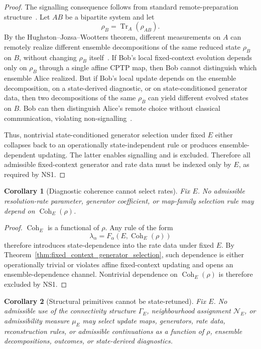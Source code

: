\documentclass[aps,prx,onecolumn,11pt]{revtex4-2}
\theoremstyle{plain}
\newtheorem{corollary}{Corollary}
\theoremstyle{definition}
\theoremstyle{remark}
\newcommand{\Coh}{\operatorname{Coh}}       %
\providecommand{\Tr}{\operatorname{Tr}}
\begin{document}
\begin{proof}
The signalling consequence follows from standard remote-preparation
structure~\cite{HughstonJozsaWootters1993}. Let \(AB\) be a bipartite
system and let
\[
\rho_B=\Tr_A(\rho_{AB}).
\]
By the Hughston--Jozsa--Wootters theorem, different measurements on
\(A\) can remotely realize different ensemble decompositions of the
same reduced state \(\rho_B\) on \(B\), without changing \(\rho_B\)
itself~\cite{NielsenChuang2010,Watrous2018}. If Bob's local
fixed-context evolution depends only on \(\rho_B\) through a single
affine CPTP map, then Bob cannot distinguish which ensemble Alice
realized. But if Bob's local update depends on the ensemble
decomposition, on a state-derived diagnostic, or on state-conditioned
generator data, then two decompositions of the same \(\rho_B\) can yield
different evolved states on \(B\). Bob can then distinguish Alice's
remote choice without classical communication, violating
non-signalling~\cite{Gisin1989,Gisin1990,Polchinski1991,Watrous2018}.

Thus, nontrivial state-conditioned generator selection under fixed
\(E\) either collapses back to an operationally state-independent rule
or produces ensemble-dependent updating. The latter enables signalling
and is excluded. Therefore all admissible fixed-context generator and
rate data must be indexed only by \(E\), as required by NS1.
\end{proof}

\begin{corollary}[Diagnostic coherence cannot select rates]
\label{cor:coherence_cannot_select_rates}
Fix \(E\). No admissible resolution-rate parameter, generator
coefficient, or map-family selection rule may depend on
\(\Coh_E(\rho)\).
\end{corollary}

\begin{proof}
\(\Coh_E\) is a functional of \(\rho\). Any rule of the form
\[
\lambda_\alpha = F_\alpha(E,\Coh_E(\rho))
\]
therefore introduces state-dependence into the rate data under fixed
\(E\). By
Theorem~\ref{thm:fixed_context_generator_selection}, such dependence is
either operationally trivial or violates affine fixed-context updating
and opens an ensemble-dependence channel. Nontrivial dependence on
\(\Coh_E(\rho)\) is therefore excluded by NS1.
\end{proof}

\begin{corollary}[Structural primitives cannot be state-retuned]
\label{cor:structural_primitives_cannot_be_state_retuned}
Fix \(E\). No admissible use of the connectivity structure
\(\Gamma_E\), neighbourhood assignment \(\mathcal N_E\), or
admissibility measure \(\mu_E\) may select update maps, generators, rate
data, reconstruction rules, or admissible continuations as a function of
\(\rho\), ensemble decompositions, outcomes, or state-derived
diagnostics.
\end{corollary}
\end{document}
